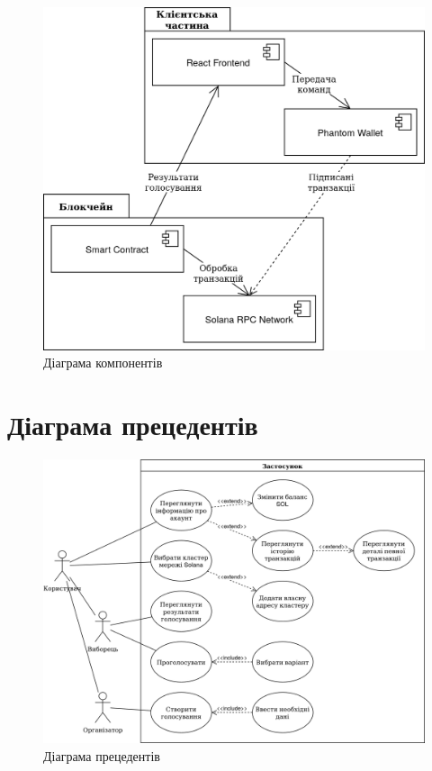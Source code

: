 \documentclass[14pt]{extreport}
\begin{document}
  \begin{figure}[H]
    \centering
    \includegraphics[scale=0.31]{UMLComponent}
    \caption{Діаграма компонентів}
  \end{figure}
  
  \chapter{Діаграма прецедентів}
  \label{app:UMLUseCase}
  
  \begin{figure}[H]
    \centering
    \includegraphics[scale=0.21]{UMLUseCase}
    \caption{Діаграма прецедентів}
  \end{figure}
  
\end{document}
